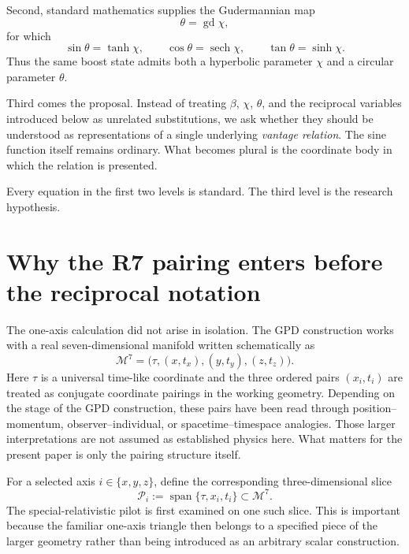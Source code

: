 \documentclass[11pt]{article}
\DeclareMathOperator{\sech}{sech}
\DeclareMathOperator{\gd}{gd}
\newcommand{\Mseven}{\mathcal{M}^{7}}
\begin{document}
Second, standard mathematics supplies the Gudermannian map
\begin{equation}
\theta=\gd\chi,
\label{eq:gd}
\end{equation}
for which
\begin{equation}
\sin\theta=\tanh\chi,
\qquad
\cos\theta=\sech\chi,
\qquad
\tan\theta=\sinh\chi.
\label{eq:gd-identities}
\end{equation}
Thus the same boost state admits both a hyperbolic parameter $\chi$ and a
circular parameter $\theta$.

Third comes the proposal. Instead of treating $\beta$, $\chi$, $\theta$, and
the reciprocal variables introduced below as unrelated substitutions, we ask
whether they should be understood as representations of a single underlying
\emph{vantage relation}. The sine function itself remains ordinary. What
becomes plural is the coordinate body in which the relation is presented.

Every equation in the first two levels is standard. The third level is the
research hypothesis.

\section{Why the R7 pairing enters before the reciprocal notation}

The one-axis calculation did not arise in isolation. The GPD construction
works with a real seven-dimensional manifold written schematically as
\begin{equation}
\Mseven
=
\bigl(\tau,(x,t_x),(y,t_y),(z,t_z)\bigr).
\label{eq:M7}
\end{equation}
Here $\tau$ is a universal time-like coordinate and the three ordered pairs
$(x_i,t_i)$ are treated as conjugate coordinate pairings in the working
geometry. Depending on the stage of the GPD construction, these pairs have
been read through position--momentum, observer--individual, or
spacetime--timespace analogies. Those larger interpretations are not assumed
as established physics here. What matters for the present paper is only the
pairing structure itself.

For a selected axis $i\in\{x,y,z\}$, define the corresponding three-dimensional
slice
\begin{equation}
\mathcal{P}_i
:=
\operatorname{span}\{\tau,x_i,t_i\}
\subset \Mseven.
\label{eq:Pi}
\end{equation}
The special-relativistic pilot is first examined on one such slice. This is
important because the familiar one-axis triangle then belongs to a specified
piece of the larger geometry rather than being introduced as an arbitrary
scalar construction.
\end{document}
